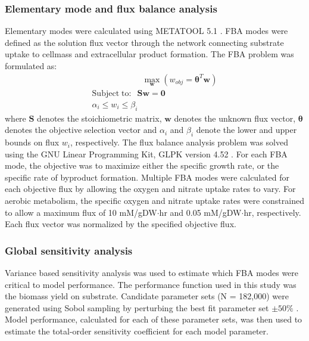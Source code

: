 \documentclass[10pt,twocolumn,twoside,final]{IEEEtran}
\begin{document}
\noindent\subsubsection*{Elementary mode and flux balance analysis}
Elementary modes were calculated using METATOOL 5.1 \cite{2006_vonKamp_Metatool}.
FBA modes were defined as the solution flux vector through the network connecting substrate uptake to cellmass and extracellular product formation.
The FBA problem was formulated as:
\begin{equation}
 \begin{multlined}
	\qquad \qquad \qquad \max_{\boldsymbol{w}}{} \! \left( w_{obj} = \mathbf{\theta}^T \boldsymbol{w} \right) \\
	\mathrm{Subject \; to:}
	 \; \; \mathbf{S}\mathbf{w}=\mathbf{0} \\
\alpha_i \leq w_i \leq \beta_i  \qquad
 \end{multlined}
\end{equation}
where $\mathbf{S}$ denotes the stoichiometric matrix, $\mathbf{w}$ denotes the unknown flux vector, $\boldsymbol{\theta}$ denotes the objective selection vector
and $\alpha_i$ and $\beta_i$ denote the lower and upper bounds on flux $w_{i}$, respectively.
The flux balance analysis problem was solved using the GNU Linear Programming Kit, GLPK version 4.52 \cite{GLPK}.
For each FBA mode, the objective was to maximize either the specific growth rate, or the specific rate of byproduct formation.
Multiple FBA modes were calculated for each objective flux by allowing the oxygen and nitrate uptake rates to vary.
For aerobic metabolism, the specific oxygen and nitrate uptake rates were constrained to allow a maximum flux of 10 mM/gDW$\cdot$hr and 0.05 mM/gDW$\cdot$hr, respectively.
Each flux vector was normalized by the specified objective flux.

\subsubsection*{Global sensitivity analysis}
Variance based sensitivity analysis was used to estimate which FBA modes were critical to model performance.
The performance function used in this study was the biomass yield on substrate.
Candidate parameter sets (N = 182,000) were generated using Sobol sampling by perturbing the best fit parameter set $\pm50\%$ \cite{SALib}.
Model performance, calculated for each of these parameter sets, was then used to estimate the total-order sensitivity coefficient for each model parameter.
\end{document}
